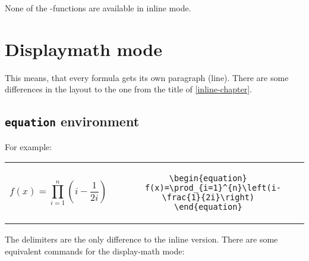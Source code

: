 None of the \AmSmath-functions are available in inline mode.

\section{Displaymath mode}\label{display}
This means, that every formula gets its own paragraph (line). There are
some differences in the layout to the one from the title
of \ref{inline-chapter}.


\subsection{\texttt{equation} environment}

For example:

\bigskip\noindent
\begin{tabular}{cc}
\begin{minipage}{0.35\linewidth}
\begin{equation}
  f(x)=\prod_{i=1}^{n}\left(i-\frac{1}{2i}\right)
\end{equation}
\end{minipage} & 
\begin{minipage}{0.63\linewidth}
\begin{lstlisting}
\begin{equation}
  f(x)=\prod_{i=1}^{n}\left(i-\frac{1}{2i}\right)
\end{equation}
\end{lstlisting}
\end{minipage}
\end{tabular}

\bigskip
The delimiters
 are the only difference to the inline version. 
There are some equivalent commands for the display-math mode:

